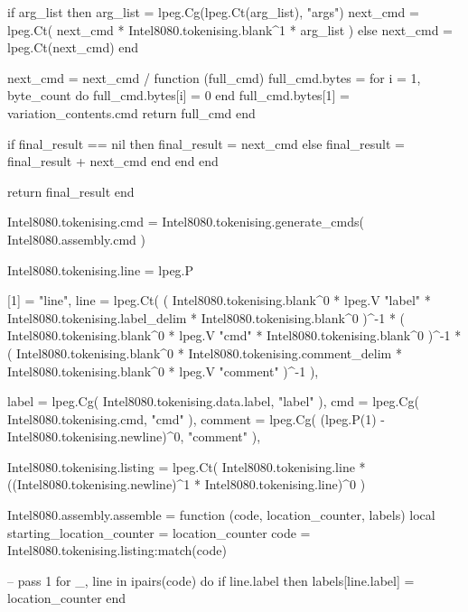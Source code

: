            if arg_list then
                arg_list = lpeg.Cg(lpeg.Ct(arg_list), "args")
                next_cmd = lpeg.Ct(
                    next_cmd * Intel8080.tokenising.blank^1 * arg_list
                )
            else
                next_cmd = lpeg.Ct(next_cmd)
            end

            next_cmd = next_cmd
                / function (full_cmd)
                    full_cmd.bytes = {}
                    for i = 1, byte_count do
                        full_cmd.bytes[i] = 0
                    end
                    full_cmd.bytes[1] = variation_contents.cmd
                    return full_cmd
                end

            if final_result == nil then
                final_result = next_cmd
            else
                final_result = final_result + next_cmd
            end
        end
    end

    return final_result
end

Intel8080.tokenising.cmd = Intel8080.tokenising.generate_cmds(
    Intel8080.assembly.cmd
)

Intel8080.tokenising.line = lpeg.P {
    [1] = "line",
    line = lpeg.Ct(
        (
            Intel8080.tokenising.blank^0
            * lpeg.V "label"
            * Intel8080.tokenising.label_delim
            * Intel8080.tokenising.blank^0
        )^-1
        *
        (
            Intel8080.tokenising.blank^0
            * lpeg.V "cmd"
            * Intel8080.tokenising.blank^0
        )^-1
        *
        (
            Intel8080.tokenising.blank^0
            * Intel8080.tokenising.comment_delim
            * Intel8080.tokenising.blank^0
            * lpeg.V "comment"
        )^-1
    ),

    label = lpeg.Cg(
        Intel8080.tokenising.data.label, "label"
    ),
    cmd = lpeg.Cg(
        Intel8080.tokenising.cmd, "cmd"
    ),
    comment = lpeg.Cg(
        (lpeg.P(1) - Intel8080.tokenising.newline)^0, "comment"
    ),
}

Intel8080.tokenising.listing = lpeg.Ct(
    Intel8080.tokenising.line * ((Intel8080.tokenising.newline)^1 * Intel8080.tokenising.line)^0
)

Intel8080.assembly.assemble = function (code, location_counter, labels)
    local starting_location_counter = location_counter
    code = Intel8080.tokenising.listing:match(code)

    -- pass 1
    for _, line in ipairs(code) do
        if line.label then
            labels[line.label] = location_counter
        end

